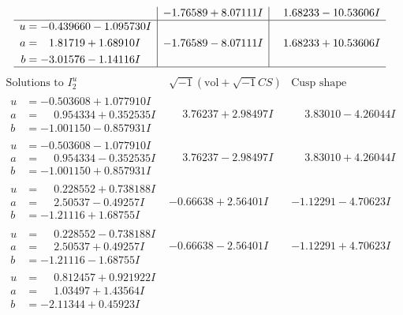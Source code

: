 \documentclass[1p]{elsarticle_modified}
\theoremstyle{definition}
\newcommand{\I}{\sqrt{-1}}
\begin{document}
$$\begin{array}{c|c|c}
 & -1.76589 + 8.07111 I & \phantom{-}1.68233 - 10.53606 I \\ \hline\begin{aligned}
u &= -0.439660 - 1.095730 I \\
a &= \phantom{-}1.81719 + 1.68910 I \\
b &= -3.01576 - 1.14116 I\end{aligned}
 & -1.76589 - 8.07111 I & \phantom{-}1.68233 + 10.53606 I\\
 \hline 
 \end{array}$$\newpage$$\begin{array}{c|c|c}  
\text{Solutions to }I^u_{2}& \I (\text{vol} + \sqrt{-1}CS) & \text{Cusp shape}\\
 \hline 
\begin{aligned}
u &= -0.503608 + 1.077910 I \\
a &= \phantom{-}0.954334 + 0.352535 I \\
b &= -1.001150 - 0.857931 I\end{aligned}
 & \phantom{-}3.76237 + 2.98497 I & \phantom{-}3.83010 - 4.26044 I \\ \hline\begin{aligned}
u &= -0.503608 - 1.077910 I \\
a &= \phantom{-}0.954334 - 0.352535 I \\
b &= -1.001150 + 0.857931 I\end{aligned}
 & \phantom{-}3.76237 - 2.98497 I & \phantom{-}3.83010 + 4.26044 I \\ \hline\begin{aligned}
u &= \phantom{-}0.228552 + 0.738188 I \\
a &= \phantom{-}2.50537 - 0.49257 I \\
b &= -1.21116 + 1.68755 I\end{aligned}
 & -0.66638 + 2.56401 I & -1.12291 - 4.70623 I \\ \hline\begin{aligned}
u &= \phantom{-}0.228552 - 0.738188 I \\
a &= \phantom{-}2.50537 + 0.49257 I \\
b &= -1.21116 - 1.68755 I\end{aligned}
 & -0.66638 - 2.56401 I & -1.12291 + 4.70623 I \\ \hline\begin{aligned}
u &= \phantom{-}0.812457 + 0.921922 I \\
a &= \phantom{-}1.03497 + 1.43564 I \\
b &= -2.11344 + 0.45923 I\end{aligned}

\end{array}$$
\end{document}

